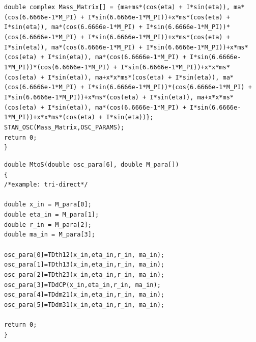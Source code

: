 \documentclass[aps,prd,nofootinbib,preprint]{revtex4}
\begin{document}
    \texttt{double complex Mass\_Matrix[] = \{ma+ms*(cos(eta) + I*sin(eta)), ma*(cos(6.6666e-1*M\_PI) + I*sin(6.6666e-1*M\_PI))+x*ms*(cos(eta) + I*sin(eta)), ma*(cos(6.6666e-1*M\_PI) + I*sin(6.6666e-1*M\_PI))*(cos(6.6666e-1*M\_PI) + I*sin(6.6666e-1*M\_PI))+x*ms*(cos(eta) + I*sin(eta)), ma*(cos(6.6666e-1*M\_PI) + I*sin(6.6666e-1*M\_PI))+x*ms*(cos(eta) + I*sin(eta)), ma*(cos(6.6666e-1*M\_PI) + I*sin(6.6666e-1*M\_PI))*(cos(6.6666e-1*M\_PI) + I*sin(6.6666e-1*M\_PI))+x*x*ms*(cos(eta) + I*sin(eta)), ma+x*x*ms*(cos(eta) + I*sin(eta)), ma*(cos(6.6666e-1*M\_PI) + I*sin(6.6666e-1*M\_PI))*(cos(6.6666e-1*M\_PI) + I*sin(6.6666e-1*M\_PI))+x*ms*(cos(eta) + I*sin(eta)), ma+x*x*ms*(cos(eta) + I*sin(eta)), ma*(cos(6.6666e-1*M\_PI) + I*sin(6.6666e-1*M\_PI))+x*x*ms*(cos(eta) + I*sin(eta))\};}\\
    
    \texttt{STAN\_OSC(Mass\_Matrix,OSC\_PARAMS);}\\
    
    \texttt{return 0;}\\
\texttt{\} }






\texttt{double MtoS(double osc\_para[6], double M\_para[])}\\
\texttt{\{}\\
    \texttt{/*example: tri-direct*/}\\
\\    
    \texttt{double x\_in   = M\_para[0];}\\
    \texttt{double eta\_in = M\_para[1];}\\
    \texttt{double r\_in   = M\_para[2];}\\
    \texttt{double ma\_in  = M\_para[3];}\\
\\  
    \texttt{osc\_para[0]=TDth12(x\_in,eta\_in,r\_in, ma\_in);}\\
    \texttt{osc\_para[1]=TDth13(x\_in,eta\_in,r\_in, ma\_in);}\\
    \texttt{osc\_para[2]=TDth23(x\_in,eta\_in,r\_in, ma\_in);}\\
    \texttt{osc\_para[3]=TDdCP(x\_in,eta\_in,r\_in, ma\_in);}\\
    \texttt{osc\_para[4]=TDdm21(x\_in,eta\_in,r\_in, ma\_in);}\\
    \texttt{osc\_para[5]=TDdm31(x\_in,eta\_in,r\_in, ma\_in);}\\
\\    
    \texttt{return 0;}\\
\texttt{\}}\\
\end{document}
